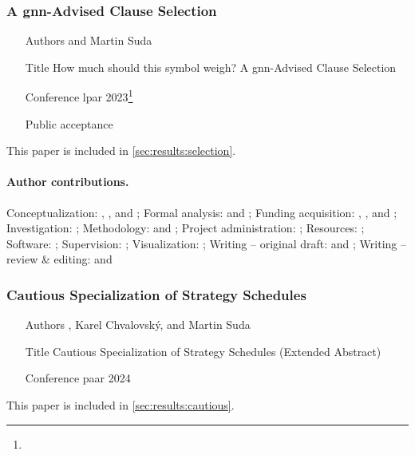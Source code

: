 \subsubsection{A \acrshort{gnn}-Advised Clause Selection}

\begin{itemize}
\item[Authors]  and Martin Suda
\item[Title] How much should this symbol weigh? A \acrshort{gnn}-Advised Clause Selection \cite{DBLP:conf/lpar/Bartek023}
\item[Conference] \Acrfull{lpar} 2023\footnote{}
\item[Public acceptance] 
\end{itemize}

This paper is included in \cref{sec:results:selection}.

\paragraph{Author contributions.}
Conceptualization:            \MS{}, \FB{}, and \CK{};
Formal analysis:              \FB{} and \MS{};
Funding acquisition:          \MS{}, \JU{}, and \FB{};
Investigation:                \FB{};
Methodology:                  \FB{} and \MS{};
Project administration:       \MS{};
Resources:                    \JU{};
Software:                     \FB{};
Supervision:                  \MS{};
Visualization:                \FB{};
Writing -- original draft:    \FB{} and \MS{};
Writing -- review \& editing: \FB{} and \MS{}

\subsubsection{Cautious Specialization of Strategy Schedules}

\begin{itemize}
\item[Authors] , Karel Chvalovský, and Martin Suda
\item[Title] Cautious Specialization of Strategy Schedules (Extended Abstract) \cite{DBLP:conf/paar/BartekC024}
\item[Conference] \Acrfull{paar} 2024
\end{itemize}

This paper is included in \cref{sec:results:cautious}.

